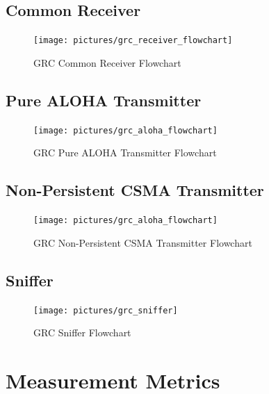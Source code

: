 \subsection{Common Receiver}

\begin{figure}[ht]
	\label{fig:grc-receiver}
	\begin{center}
		\texttt{[image: pictures/grc\_receiver\_flowchart]}
	\end{center}
	\caption{GRC Common Receiver Flowchart}
\end{figure}

\subsection{Pure ALOHA Transmitter}

\begin{figure}[h]
	\label{fig:grc-aloha-sender}
	\begin{center}
		\texttt{[image: pictures/grc\_aloha\_flowchart]}
\end{center}
\caption{GRC Pure ALOHA Transmitter Flowchart}
\end{figure}

\subsection{Non-Persistent CSMA Transmitter}

\begin{figure}[h]
	\label{fig:grc-csma-sender}
	\begin{center}
		\texttt{[image: pictures/grc\_aloha\_flowchart]}
\end{center}
\caption{GRC Non-Persistent CSMA Transmitter Flowchart}
\end{figure}

\subsection{Sniffer}

\begin{figure}[h]
	\label{fig:grc-sniffer}
	\begin{center}
		\texttt{[image: pictures/grc\_sniffer]}
	\end{center}
	\caption{GRC Sniffer Flowchart}
\end{figure}

\section{Measurement Metrics}

